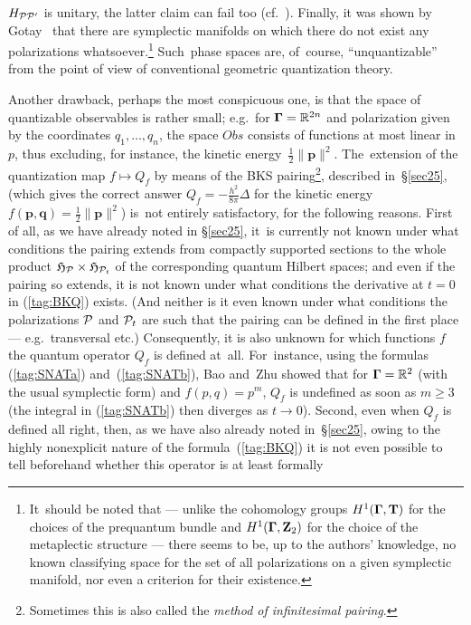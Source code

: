\documentclass[12pt]{amsart}
\numberwithin{equation}{section}
\theoremstyle{remark}
\newcommand\TT{{\bold T}}
\newcommand\Obs{Obs}
\newcommand\Omg{{\bigam}}   %
\newcommand\PP{{\Cal P}}
\newcommand\ZZ{\bold Z}
\newcommand\GG{{\PP'}}
\newcommand\HH{\mathfrak H}
\newcommand\RR{\mathbb R}
\newcommand{\bigam}{\mbox{\boldmath $\Gamma$}}
\newcommand{\bp}{\mathbf p}
\newcommand{\bq}{\mathbf q}
\begin{document}
$H_{\PP\GG}$ is unitary, the latter claim can fail too (cf.~\cite{bib:TuyGBK}).
Finally, it was shown by Gotay~\cite{bib:Gotay} that there are symplectic
manifolds on which there do not exist any polarizations
whatsoever.\footnote{It~should be noted that --- unlike the cohomology groups
$H^1(\Omg,\TT)$ for the choices of the prequantum bundle and $H^1(\Omg,\ZZ_2)$
for the choice of the metaplectic structure --- there seems to be, up to the
authors' knowledge, no known classifying space for the set of all polarizations
on a given symplectic manifold, nor even a criterion for their existence.}
Such~phase spaces are, of~course, ``unquantizable'' from the point of view of
conventional geometric quantization theory.

Another drawback, perhaps the most conspicuous one, is that the space of
quantizable observables is rather small; e.g.~for $\Omg=\RR^{2n}$ and
polarization given by the coordinates $q_1,\dots,q_n$, the space $\Obs$
consists of functions at most linear
in~$p$, thus excluding, for instance, the kinetic energy~$\frac12\|\bp\|^2$.
The~extension of the quantization map $f\mapsto Q_f$ by means of the BKS
pairing\footnote{Sometimes this is also called the {\it method of infinitesimal
pairing\/}.}, described in~\S\ref{sec25}, (which gives the correct answer
$Q_f=-\frac{h^2}{8\pi}\Delta$ for the kinetic energy
$f(\bp,\bq)=\frac12\|\bp\|^2$) is~not entirely satisfactory, for the following
reasons. First of all, as we have already noted in \S\ref{sec25}, it~is
currently not known under what conditions the pairing extends from compactly
supported sections to the whole product $\HH_\PP\times\HH_{\PP_t}$ of the
corresponding quantum Hilbert spaces; and even if the pairing so extends, it is
not known under what conditions the derivative at $t=0$ in (\ref{tag:BKQ})
exists. (And neither is it even known under what conditions the polarizations
$\PP$ and $\PP_t$ are such that the pairing can be defined in the first place
--- e.g.~transversal etc.) Consequently, it is also unknown for which functions
$f$ the quantum operator $Q_f$ is defined at~all. For~instance, using the
formulas (\ref{tag:SNATa}) and~(\ref{tag:SNATb}), Bao and~Zhu
\cite{bib:BaoZnew} showed that for $\Omg=\RR^{2}$ (with the usual symplectic
form) and $f(p,q)=p^m$, $Q_f$ is undefined as soon as $m\ge3$ (the integral in
(\ref{tag:SNATb}) then diverges as $t\to0$). Second, even when $Q_f$ is defined
all right, then, as we have also already noted in~\S\ref{sec25}, owing to the
highly nonexplicit nature of the formula~(\ref{tag:BKQ}) it is not even
possible to tell beforehand whether this operator is at least formally
\end{document}

